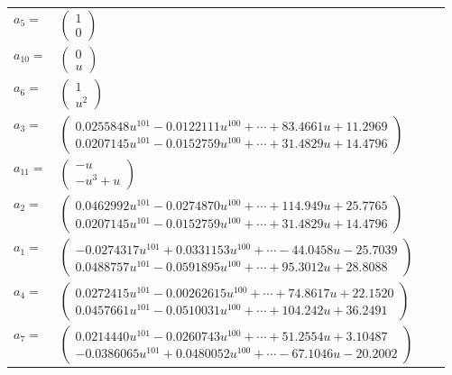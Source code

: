 \documentclass[1p]{elsarticle_modified}
\theoremstyle{definition}
\begin{document}
\begin{tabular}{m{7pt} m{180pt} m{7pt} m{180pt} }
\flushright $a_{5}=$&$\begin{pmatrix}1\\0\end{pmatrix}$ \\
\flushright $a_{10}=$&$\begin{pmatrix}0\\u\end{pmatrix}$ \\
\flushright $a_{6}=$&$\begin{pmatrix}1\\u^2\end{pmatrix}$ \\
\flushright $a_{3}=$&$\begin{pmatrix}0.0255848 u^{101}-0.0122111 u^{100}+\cdots+83.4661 u+11.2969\\0.0207145 u^{101}-0.0152759 u^{100}+\cdots+31.4829 u+14.4796\end{pmatrix}$ \\
\flushright $a_{11}=$&$\begin{pmatrix}- u\\- u^3+u\end{pmatrix}$ \\
\flushright $a_{2}=$&$\begin{pmatrix}0.0462992 u^{101}-0.0274870 u^{100}+\cdots+114.949 u+25.7765\\0.0207145 u^{101}-0.0152759 u^{100}+\cdots+31.4829 u+14.4796\end{pmatrix}$ \\
\flushright $a_{1}=$&$\begin{pmatrix}-0.0274317 u^{101}+0.0331153 u^{100}+\cdots-44.0458 u-25.7039\\0.0488757 u^{101}-0.0591895 u^{100}+\cdots+95.3012 u+28.8088\end{pmatrix}$ \\
\flushright $a_{4}=$&$\begin{pmatrix}0.0272415 u^{101}-0.00262615 u^{100}+\cdots+74.8617 u+22.1520\\0.0457661 u^{101}-0.0510031 u^{100}+\cdots+104.242 u+36.2491\end{pmatrix}$ \\
\flushright $a_{7}=$&$\begin{pmatrix}0.0214440 u^{101}-0.0260743 u^{100}+\cdots+51.2554 u+3.10487\\-0.0386065 u^{101}+0.0480052 u^{100}+\cdots-67.1046 u-20.2002\end{pmatrix}$ \\

\end{tabular}
\end{document}
